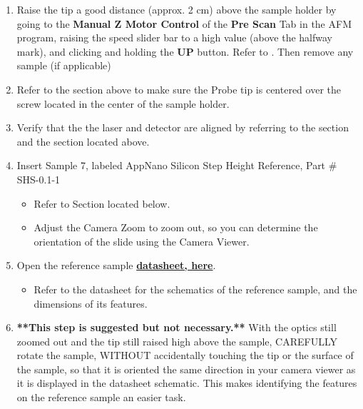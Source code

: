 \documentclass{../lab}
\begin{document}
\begin{enumerate}
    \item Raise the tip a good distance (approx. 2 cm) above the sample holder by going to the \textbf{Manual Z Motor Control} of the \textbf{Pre Scan }Tab in the AFM program, raising the speed slider bar to a high value (above the halfway mark), and clicking and holding the \textbf{UP }button.  Refer to \textbf{}.  Then remove any sample (if applicable)

    \item Refer to the \textbf{} section above to make sure the Probe tip is centered over the screw located in the center of the sample holder.

    \item Verify that the the laser and detector are aligned by referring to the\textbf{ } section and the \textbf{} section located above.

    \item Insert Sample 7, labeled AppNano Silicon Step Height Reference, Part \# SHS-0.1-1

    \begin{itemize}
        \item ​​​Refer to Section located below.

        \item Adjust the Camera Zoom to zoom out, so you can determine the orientation of the slide using the Camera Viewer.

    \end{itemize}

    \item Open the reference sample \href{http://experimentationlab.berkeley.edu/sites/default/files/AFMImages/Reference-\%20sample-SHS-01\_3\_datasheet.pdf}{\textbf{datasheet, here}}.

    \begin{itemize}
        \item Refer to the datasheet for the schematics of the reference sample, and the dimensions of its features.

    \end{itemize}

    \item \textbf{**This step is suggested but not necessary.**  }With the optics still zoomed out and the tip still raised high above the sample, CAREFULLY rotate the sample, WITHOUT accidentally touching the tip or the surface of the sample, so that it is oriented the same direction in your camera viewer as it is displayed in the datasheet schematic.  This makes identifying the features on the reference sample an easier task.


\end{enumerate}
\end{document}
